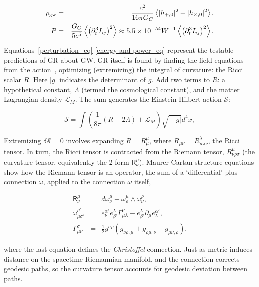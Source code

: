 \begin{eqnarray}
\rho_{\textup{gw}} &=& \frac{c^2}{16 \pi G_C} \left\langle |h_{+,0}|^2 + |h_{\times,0}|^2 \right\rangle,\\
P &=& \frac{G_C}{5c^5}\left\langle \left( \partial_t^3 I_{ij}\right)^2  \right\rangle \approx 5.5\times 10^{-54} W^{-1} \left\langle \left( \partial_t^3 I_{ij}\right)^2  \right\rangle.
\label{energy-and-power_eq}
\end{eqnarray}

Equations~\ref{perturbation_eq}-\ref{energy-and-power_eq} represent the testable predictions of GR about GW. 
GR itself is found by finding the field equations from the action~\cite{FarrThesis}, optimizing (extremizing) the integral of curvature: the Ricci scalar $R$.
Here $|g|$ indicates the determinant of $g$. Add two terms to $R$: a hypothetical constant, $\Lambda$ (termed the cosmological constant), and the matter Lagrangian density $\mathcal{L}_M$. The sum generates the Einstein-Hilbert action $\mathcal{S}$:

\begin{equation}
\mathcal{S} = \int \left( \frac{1}{8\pi}\left(R - 2\Lambda\right) + \mathcal{L}_M \right) \sqrt{-|g|}d^4 x,
\end{equation}

Extremizing $\delta \mathcal{S} = 0$ involves expanding $R = R^\mu_\mu$, where $R_{\mu\nu} = R^\lambda_{\mu\lambda\nu}$, the Ricci tensor. 
In turn, the Ricci tensor is contracted from the Riemann tensor, $R^\mu_{\nu\rho\sigma}$ (the curvature tensor, equivalently the 2-form $\textsf{R}^\mu_\nu$). Maurer-Cartan structure equations show how the Riemann tensor is an operator, the sum of a `differential' plus connection $\omega$, applied to the connection $\omega$ itself,

\begin{eqnarray}
\textsf{R}^\mu_\nu &=& d\omega^\mu_\nu + \omega^\mu_\rho \wedge \omega^\rho_\nu, \\
\omega^{\rho'}_{\mu\sigma'} &=& e^{\alpha'}_{\nu} e^{\lambda}_{\beta'} \Gamma^{\nu}_{\mu\lambda} - e^{\lambda}_{\beta'} \partial_{\mu} e^{\alpha'}_{\lambda},\\
\Gamma^\sigma_{\mu\nu} &=& \frac{1}{2} g^{\sigma\rho} \left( g_{\nu \rho, \mu} + g_{\rho \mu, \nu} - g_{\mu\nu,\rho} \right). 
\end{eqnarray}

\noindent where the last equation defines the \textit{Christoffel} connection. Just as metric induces distance on the spacetime Riemannian manifold, and the connection corrects geodesic paths, so the curvature tensor accounts for geodesic deviation between paths.

